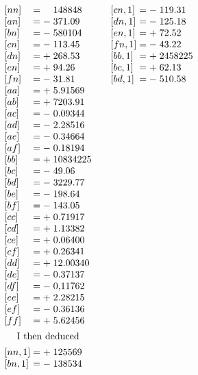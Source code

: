 {\fontsize{9}{11}\selectfont
\[
\begin{array}{@{}l@{\qquad}l@{\qquad}l@{}}
\begin{array}[t]{@{}l@{\;}c@{\;}c@{\;}l@{}}
{[nn]}&=&&148848\\
{[an]}&=&-&371.09\\
{[bn]}&=&-&580104\\
{[cn]}&=&-&113.45\\
{[dn]}&=&+&268.53\\
{[en]}&=&+&94.26\\
{[fn]}&=&-&31.81\\
{[aa]}&=&+&5.91569\\
{[ab]}&=&+&7203.91\\
{[ac]}&=&-&0.09344\\
{[ad]}&=&-&2.28516\\
{[ae]}&=&-&0.34664\\
{[af]}&=&-&0.18194\\
{[bb]}&=&+&10834225\\
{[bc]}&=&-&49.06\\
{[bd]}&=&-&3229.77\\
{[be]}&=&-&198.64\\
{[bf]}&=&-&143.05\\
{[cc]}&=&+&0.71917\\
{[cd]}&=&+&1.13382\\
{[ce]}&=&+&0.06400\\
{[cf]}&=&+&0.26341\\
{[dd]}&=&+&12.00340\\
{[de]}&=&-&0.37137\\
{[df]}&=&-&0{,}11762\\
{[ee]}&=&+&2.28215\\
{[ef]}&=&-&0.36136\\
{[ff]}&=&+&5.62456\\[4.5pt]
\multicolumn{4}{@{}c@{}}{\text{I then deduced}}\\[4.5pt]
{[nn,1]}&=&+&125569\\
{[bn,1]}&=&-&138534
\end{array}&
\begin{array}[t]{@{}l@{\;}c@{\;}c@{\;}l@{}}
{[cn,1]}&=&-&119.31\\
{[dn,1]}&=&-&125.18\\
{[en,1]}&=&+&72.52\\
{[fn,1]}&=&-&43.22\\
{[bb,1]}&=&+&2458225\\
{[bc,1]}&=&+&62.13\\
{[bd,1]}&=&-&510.58\\

\end{array}
\end{array}\]}
